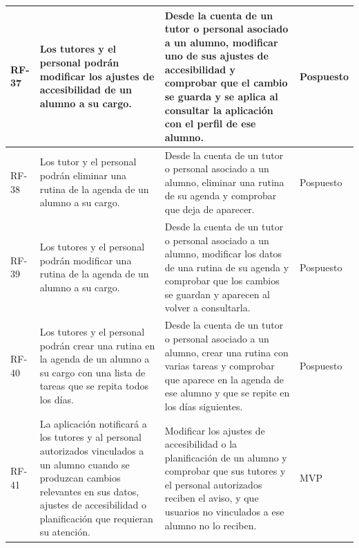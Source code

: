 \begin{longtable}{|>{\raggedright\arraybackslash}p{1cm}|>{\raggedright\arraybackslash}p{6cm}|>{\criterioinicio}p{5.9cm}<{\criteriofin}|>{\centering\arraybackslash}p{1.8cm}|}
\hline
\hypertarget{rf-37}{}RF-37 & Los tutores y el personal podrán modificar los ajustes de accesibilidad de un alumno a su cargo. & Desde la cuenta de un tutor o personal asociado a un alumno, modificar uno de sus ajustes de accesibilidad y comprobar que el cambio se guarda y se aplica al consultar la aplicación con el perfil de ese alumno. & Pospuesto \\
\hline
\hypertarget{rf-38}{}RF-38 & Los tutor y el personal podrán eliminar una rutina de la agenda de un alumno a su cargo. & Desde la cuenta de un tutor o personal asociado a un alumno, eliminar una rutina de su agenda y comprobar que deja de aparecer. & Pospuesto \\
\hline
\hypertarget{rf-39}{}RF-39 & Los tutores y el personal podrán modificar una rutina de la agenda de un alumno a su cargo. & Desde la cuenta de un tutor o personal asociado a un alumno, modificar los datos de una rutina de su agenda y comprobar que los cambios se guardan y aparecen al volver a consultarla. & Pospuesto \\
\hline
\hypertarget{rf-40}{}RF-40 & Los tutores y el personal podrán crear una rutina en la agenda de un alumno a su cargo con una lista de tareas que se repita todos los días. & Desde la cuenta de un tutor o personal asociado a un alumno, crear una rutina con varias tareas y comprobar que aparece en la agenda de ese alumno y que se repite en los días siguientes. & Pospuesto \\
\hline
\hypertarget{rf-41}{}RF-41 & La aplicación notificará a los tutores y al personal autorizados vinculados a un alumno cuando se produzcan cambios relevantes en sus datos, ajustes de accesibilidad o planificación que requieran su atención. & Modificar los ajustes de accesibilidad o la planificación de un alumno y comprobar que sus tutores y el personal autorizados reciben el aviso, y que usuarios no vinculados a ese alumno no lo reciben. & MVP \\
\hline
\end{longtable}
\endgroup

